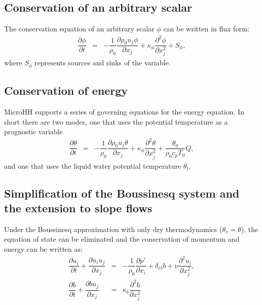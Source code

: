 \documentclass[gmd]{copernicus}
\begin{document}
\subsection{Conservation of an arbitrary scalar}
The conservation equation of an arbitrary scalar $\phi$ can be written in flux form:
\begin{eqnarray}
\dfrac{\partial \phi}{\partial t} & = & - \dfrac{1}{\rho_0} \dfrac{\partial \rho_0 u_j \phi}{\partial x_j} +
\kappa_\phi \dfrac{\partial^2 \phi}{\partial x_j^2} + S_\phi,
\end{eqnarray}
where $S_\phi$ represents sources and sinks of the variable.

\subsection{Conservation of energy}
MicroHH supports a series of governing equations for the energy equation. In short there are two modes, one that uses the potential temperature as a prognostic variable
\begin{eqnarray}
\dfrac{\partial \theta}{\partial t} & = & - \dfrac{1}{\rho_0} \dfrac{\partial \rho_0 u_j \theta}{\partial x_j} + \kappa_\phi \dfrac{\partial^2 \theta}{\partial x_j^2} + \dfrac{\theta_0}{\rho_0 c_p T_0} Q,
\end{eqnarray}
and one that uses the liquid water potential temperature $\theta_l$.



\subsection{Simplification of the Boussinesq system and the extension to slope flows}
Under the Boussinesq approximation with only dry thermodynamics ($\theta_v = \theta$), the equation of state can be eliminated and the conservation of momentum and energy can be written as:
\begin{eqnarray}
\dfrac{\partial u_i}{\partial t} + \dfrac{\partial u_i u_j}{\partial x_j} & = & 
- \dfrac{1}{\rho_0}\dfrac{\partial p'}{\partial x_i} + \delta_{i3} b + \nu \dfrac{\partial^2 u_i}{\partial x_j^2}\label{eq:consmombsimp},\\
\dfrac{\partial b}{\partial t} + \dfrac{\partial b u_j}{\partial x_j} & = & 
\kappa_b \dfrac{\partial^2 b}{\partial x_j^2}\label{eq:consenbsimp}
\end{eqnarray}
\end{document}
